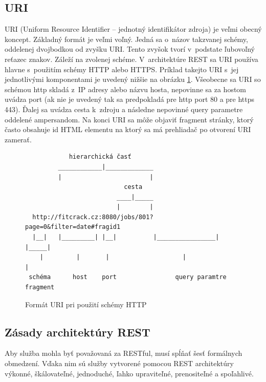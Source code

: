 \documentclass[slovak]{fitthesis}
\begin{document}
\subsection{URI} \label{URI}
URI (Uniform Resource Identifier – jednotný identifikátor zdroja) je veľmi obecný koncept. Základný formát je veľmi voľný. Jedná sa o~názov takzvanej schémy, oddelenej dvojbodkou od zvyšku URI. Tento zvyšok tvorí v~podstate ľubovoľný reťazec znakov. Záleží na zvolenej schéme\cite{URIRFC}. V~architektúre REST sa URI používa hlavne s~použitím schémy HTTP alebo HTTPS. Príklad takejto URI s~jej jednotlivými komponentami je uvedený nižšie na obrázku \ref{fig:formatURI}. Všeobecne sa URI so schémou http skladá z~IP adresy alebo názvu hosta, nepovinne sa za hostom uvádza port (ak nie je uvedený tak sa predpokladá pre http port 80 a pre https 443). Ďalej sa uvádza cesta k~zdroju a následne nepovinné query parametre oddelené ampersandom. Na konci URI sa môže objaviť fragment stránky, ktorý často obsahuje id HTML elementu na ktorý sa má prehliadač po otvorení URI zamerať.



\begin{figure}[H]
\begin{center}
\begin{varwidth}{\linewidth}
\begin{verbatim}
            hierarchická časť
         ____________|_____________                  
         |                        |
                           cesta
                         ____|_____
                         |        |
  http://fitcrack.cz:8080/jobs/801?page=0&filter=date#fragid1
  |__|   |_________| |__|          |________________| |_____|
    |         |       |                    |               |
 schéma      host    port                query paramtre  fragment

\end{verbatim}
\end{varwidth}
\end{center}
\caption{Formát URI pri použití schémy HTTP}
\label{fig:formatURI}
\end{figure}



\subsection{Zásady architektúry REST} \label{zasadyREST}
Aby služba mohla byť považovaná za RESTful, musí spĺňať šesť formálnych obmedzení. Vďaka nim sú služby vytvorené pomocou REST architektúry výkonné, škálovateľné, jednoduché, ľahko upraviteľné, prenositeľné a spoľahlivé.
\end{document}
